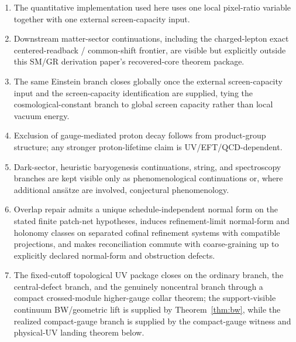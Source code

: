 \documentclass[11pt]{article}
\begin{document}
\begin{enumerate}[leftmargin=2em]
\item The quantitative implementation used here uses one local pixel-ratio variable together with one external screen-capacity input.
\item Downstream matter-sector continuations, including the charged-lepton exact centered-readback / common-shift frontier, are visible but explicitly outside this SM/GR derivation paper's recovered-core theorem package.
\item The same Einstein branch closes globally once the external screen-capacity input and the screen-capacity identification are supplied, tying the cosmological-constant branch to global screen capacity rather than local vacuum energy.
\item Exclusion of gauge-mediated proton decay follows from product-group structure; any stronger proton-lifetime claim is UV/EFT/QCD-dependent.
\item Dark-sector, heuristic baryogenesis continuations, string, and spectroscopy branches are kept visible only as phenomenological continuations or, where additional ans\"atze are involved, conjectural phenomenology.
\item Overlap repair admits a unique schedule-independent normal form on the stated finite patch-net hypotheses, induces refinement-limit normal-form and holonomy classes on separated cofinal refinement systems with compatible projections, and makes reconciliation commute with coarse-graining up to explicitly declared normal-form and obstruction defects.
\item The fixed-cutoff topological UV package closes on the ordinary branch, the central-defect branch, and the genuinely noncentral branch through a compact crossed-module higher-gauge collar theorem; the support-visible continuum BW/geometric lift is supplied by Theorem~\ref{thm:bw}, while the realized compact-gauge branch is supplied by the compact-gauge witness and physical-UV landing theorem below.
\end{enumerate}
\end{document}
